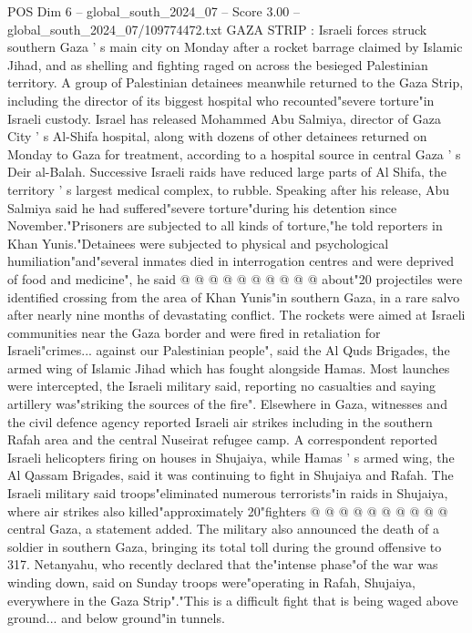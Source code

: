 \begin{textsample}{POS Dim 6 – global\_south\_2024\_07 – Score 3.00 – global\_south\_2024\_07/109774472.txt}  \label{ex:f6_pos_337}
GAZA STRIP : Israeli forces struck southern Gaza ' s main city on Monday after a rocket barrage claimed by Islamic Jihad, and as shelling and fighting raged on across the besieged Palestinian territory.
A group of Palestinian detainees meanwhile returned to the Gaza Strip, including the director of its biggest hospital who recounted"severe torture"in Israeli custody.
Israel has released Mohammed Abu Salmiya, director of Gaza City ' s Al-Shifa hospital, along with dozens of other detainees returned on Monday to Gaza for treatment, according to a hospital source in central Gaza ' s Deir al-Balah.
Successive Israeli raids have reduced large parts of Al Shifa, the territory ' s largest medical complex, to rubble.
Speaking after his release, Abu Salmiya said he had suffered"severe torture"during his detention since November."Prisoners are subjected to all kinds of torture,"he told reporters in Khan Yunis."Detainees were subjected to physical and psychological humiliation"and"several inmates died in interrogation centres and were deprived of food and medicine", he said @ @ @ @ @ @ @ @ @ @ about"20 projectiles were identified crossing from the area of Khan Yunis"in southern Gaza, in a rare salvo after nearly nine months of devastating conflict.
The rockets were aimed at Israeli communities near the Gaza border and were fired in retaliation for Israeli"crimes... against our Palestinian people", said the Al Quds Brigades, the armed wing of Islamic Jihad which has fought alongside Hamas.
Most launches were intercepted, the Israeli military said, reporting no casualties and saying artillery was"striking the sources of the fire".
Elsewhere in Gaza, witnesses and the civil defence agency reported Israeli air strikes including in the southern Rafah area and the central Nuseirat refugee camp.
A correspondent reported Israeli helicopters firing on houses in Shujaiya, while Hamas ' s armed wing, the Al Qassam Brigades, said it was continuing to fight in Shujaiya and Rafah.
The Israeli military said troops"eliminated numerous terrorists"in raids in Shujaiya, where air strikes also killed"approximately 20"fighters @ @ @ @ @ @ @ @ @ @ central Gaza, a statement added.
The military also announced the death of a soldier in southern Gaza, bringing its total toll during the ground offensive to 317.
Netanyahu, who recently declared that the"intense phase"of the war was winding down, said on Sunday troops were"operating in Rafah, Shujaiya, everywhere in the Gaza Strip"."This is a difficult fight that is being waged above ground... and below ground"in tunnels.

\end{textsample}
